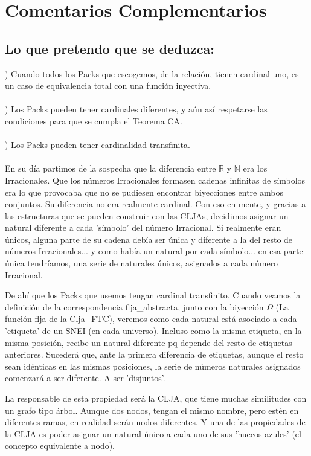 \chapter[Ordenados por referencias, no por aparición]{Comentarios Complementarios}

\section {Lo que pretendo que se deduzca:}

) Cuando todos los Packs que escogemos, de la relación, tienen cardinal uno, es un caso de equivalencia total con una función inyectiva.\\\\
) Los Packs pueden tener cardinales diferentes, y aún así respetarse las condiciones para que se cumpla el Teorema CA.\\\\
) Los Packs pueden tener cardinalidad transfinita.\\\\

En su día partimos de la sospecha que la diferencia entre $\mathbb{R}$ y $\mathbb{N}$ era los Irracionales. Que los números Irracionales formasen cadenas infinitas de símbolos era lo que provocaba que no se pudiesen encontrar biyecciones entre ambos conjuntos. Su diferencia no era realmente cardinal. Con eso en mente, y gracias a las estructuras que se pueden construir con las CLJAs, decidimos asignar un natural diferente a cada 'símbolo' del número Irracional. Si realmente eran únicos, alguna parte de su cadena debía ser única y diferente a la del resto de números Irracionales... y como había un natural por cada símbolo... en esa parte única tendríamos, una serie de naturales únicos, asignados a cada número Irracional.

De ahí que los Packs que usemos tengan cardinal transfinito. Cuando veamos la definición de la correspondencia flja\_abstracta, junto con la biyección $\Omega$ (La función flja de la Clja\_FTC), veremos como cada natural está asociado a cada 'etiqueta' de un SNEI (en cada universo). Incluso como la misma etiqueta, en la misma posición, recibe un natural diferente pq depende del resto de etiquetas anteriores. Sucederá que, ante la primera diferencia de etiquetas, aunque el resto sean idénticas en las mismas posiciones, la serie de números naturales asignados comenzará a ser diferente. A ser 'disjuntos'.

La responsable de esta propiedad será la CLJA, que tiene muchas similitudes con un grafo tipo árbol. Aunque dos nodos, tengan el mismo nombre, pero estén en diferentes ramas, en realidad serán nodos diferentes. Y una de las propiedades de la CLJA es poder asignar un natural único a cada uno de sus 'huecos azules' (el concepto equivalente a nodo).

